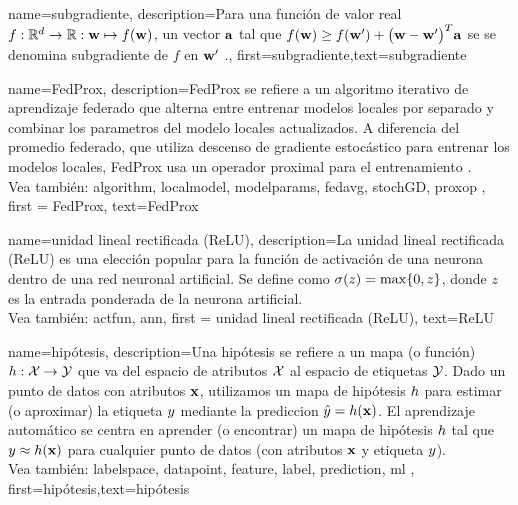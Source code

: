 {name={subgradiente},
description={Para una función de valor real $f: \mathbb{R}^{d} \rightarrow \mathbb{R}: {\bf w} \mapsto f({\bf w})$, 
		un vector ${\bf a}$ tal que $f({\bf w}) \geq  f({\bf w}') +\big({\bf w}-{\bf w}' \big)^{T} {\bf a}$ se 
		se denomina subgradiente de $f$ en ${\bf w}'$ \cite{BertCvxAnalOpt,BertsekasNonLinProgr}.},
	first={subgradiente},text={subgradiente} 
}



{name={FedProx},
	description={FedProx  se refiere a un algoritmo iterativo de aprendizaje federado que alterna entre entrenar modelos locales por separado y combinar los parametros del modelo locales actualizados. 
		A diferencia del promedio federado, que utiliza descenso de gradiente estocástico para entrenar los modelos locales, FedProx usa un operador proximal para el entrenamiento \cite{FedProx2020}.
		\\
		Vea también: \gls{algorithm}, \gls{localmodel}, \glspl{modelparam}, \gls{fedavg}, \gls{stochGD}, \gls{proxop} }, 
	first = {FedProx}, text={FedProx} 
}

{name={unidad lineal rectificada (ReLU)},
	description={La unidad lineal rectificada (ReLU) es una elección popular para la 
		función de activación de una neurona dentro de una red neuronal artificial. Se define como  
		$\sigma(z) = \max\{0,z\}$, donde $z$ es la entrada ponderada de la neurona artificial.
		\\
		Vea también: \gls{actfun}, \gls{ann}}, 
	first = {unidad lineal rectificada (ReLU)}, text={ReLU} 
}

{name={hipótesis},
	description={Una hipótesis se refiere a un mapa (o función) $h: \mathcal{X} \rightarrow \mathcal{Y}$ que va del
		espacio de atributos $\mathcal{X}$ al espacio de etiquetas $\mathcal{Y}$. 
		Dado un punto de datos con atributos ${\bf x}$, utilizamos un mapa de hipótesis $h$
		para estimar (o aproximar) la etiqueta $y$ mediante la prediccion
		$\hat{y} = h({\bf x})$. El aprendizaje automático se centra en aprender (o encontrar) un mapa de hipótesis 
		$h$ tal que $y \approx h({\bf x})$ 
		para cualquier punto de datos (con atributos ${\bf x}$ y etiqueta $y$).
		\\
		Vea también: \gls{labelspace}, \gls{datapoint}, \gls{feature}, \gls{label}, \gls{prediction}, \Gls{ml}  },
	first={hipótesis},text={hipótesis}  
}



